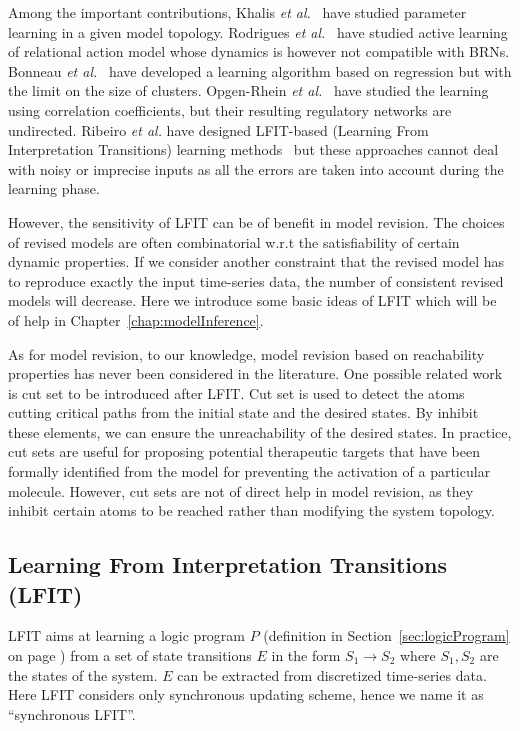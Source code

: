 Among the important contributions, Khalis \textit{et al.}~\cite{khalis2009smbionet} have studied parameter learning in a given model topology.
Rodrigues \textit{et al.}~\cite{rodrigues2011active} have studied active learning of relational action model whose dynamics is however not compatible with BRNs.
Bonneau \textit{et al.}~\cite{bonneau2006inferelator} have developed a learning algorithm based on regression but with the limit on the size of clusters.
Opgen-Rhein \textit{et al.}~\cite{opgen2007correlation} have studied the learning using correlation coefficients, but their resulting regulatory networks are undirected. 
Ribeiro \textit{et al.} have designed LFIT-based (Learning From Interpretation Transitions) learning methods~\cite{ribeiro2015learning,ribeiro2018learning,ribeiro2017inductive} but these approaches cannot deal with noisy or imprecise inputs as all the errors are taken into account during the learning phase.

However, the sensitivity of LFIT can be of benefit in model revision.
The choices of revised models are often combinatorial w.r.t the satisfiability of certain dynamic properties.
If we consider another constraint that the revised model has to reproduce exactly the input time-series data, the number of consistent revised models will decrease.
Here we introduce some basic ideas of LFIT which will be of help in Chapter~\ref{chap:modelInference}.

As for model revision, to our knowledge, model revision based on reachability properties has never been considered in the literature.
One possible related work is cut set to be introduced after LFIT.
Cut set is used to detect the atoms cutting critical paths from the initial state and the desired states.
By inhibit these elements, we can ensure the unreachability of the desired states.
In practice, cut sets are useful for proposing potential therapeutic targets that have been formally identified from the model for preventing the activation of a particular molecule.
However, cut sets are not of direct help in model revision, as they inhibit certain atoms to be reached rather than modifying the system topology.

\subsection{Learning From Interpretation Transitions (LFIT)}\label{sec:lfitSyn}
LFIT aims at learning a logic program $P$ (definition in Section~\ref{sec:logicProgram} on page \pageref{sec:logicProgram}) from a set of state transitions $E$ in the form $S_1\to S_2$ where $S_1,S_2$ are the states of the system.
$E$ can be extracted from discretized time-series data.
Here LFIT considers only synchronous updating scheme, hence we name it as ``synchronous LFIT''.

